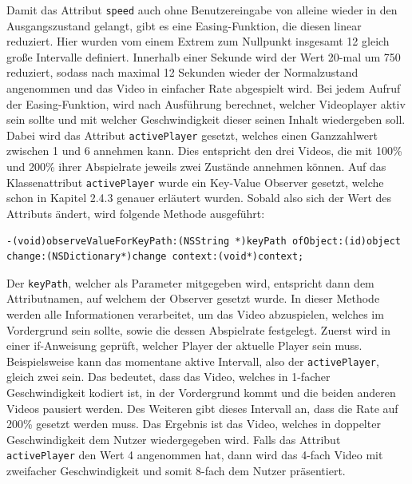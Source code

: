 \documentclass[11pt,a4paper]{report}
\begin{document}
Damit das Attribut \texttt{speed} auch ohne Benutzereingabe von alleine wieder in den Ausgangszustand gelangt, gibt es eine Easing-Funktion, die diesen linear reduziert. Hier wurden vom einem Extrem zum Nullpunkt insgesamt 12 gleich große Intervalle definiert. Innerhalb einer Sekunde wird der Wert 20-mal um 750 reduziert, sodass nach maximal 12 Sekunden wieder der Normalzustand angenommen und das Video in einfacher Rate abgespielt wird. Bei jedem Aufruf der Easing-Funktion, wird nach Ausführung berechnet, welcher Videoplayer aktiv sein sollte und mit welcher Geschwindigkeit dieser seinen Inhalt wiedergeben soll. Dabei wird das Attribut \texttt{activePlayer} gesetzt, welches einen Ganzzahlwert zwischen 1 und 6 annehmen kann. Dies entspricht den drei Videos, die mit 100\% und 200\% ihrer Abspielrate jeweils zwei Zustände annehmen können. Auf das Klassenattribut \texttt{activePlayer} wurde ein Key-Value Observer gesetzt, welche schon in Kapitel 2.4.3 genauer erläutert wurden. Sobald also sich der Wert des Attributs ändert, wird folgende Methode ausgeführt:
\begin{lstlisting}
-(void)observeValueForKeyPath:(NSString *)keyPath ofObject:(id)object change:(NSDictionary*)change context:(void*)context;
\end{lstlisting}
Der \texttt{keyPath}, welcher als Parameter mitgegeben wird, entspricht dann dem Attributnamen, auf welchem der Observer gesetzt wurde. In dieser Methode werden alle Informationen verarbeitet, um das Video abzuspielen, welches im Vordergrund sein sollte, sowie die dessen Abspielrate festgelegt. Zuerst wird in einer if-Anweisung geprüft, welcher Player der aktuelle Player sein muss. Beispielsweise kann das momentane aktive Intervall, also der \texttt{activePlayer}, gleich zwei sein. Das bedeutet, dass das Video, welches in 1-facher Geschwindigkeit kodiert ist, in der Vordergrund kommt und die beiden anderen Videos pausiert werden. Des Weiteren gibt dieses Intervall an, dass die Rate auf 200\% gesetzt werden muss. Das Ergebnis ist das Video, welches in doppelter Geschwindigkeit dem Nutzer wiedergegeben wird. Falls das Attribut \texttt{activePlayer} den Wert 4 angenommen hat, dann wird das 4-fach Video mit zweifacher Geschwindigkeit und somit 8-fach dem Nutzer präsentiert.
\end{document}
